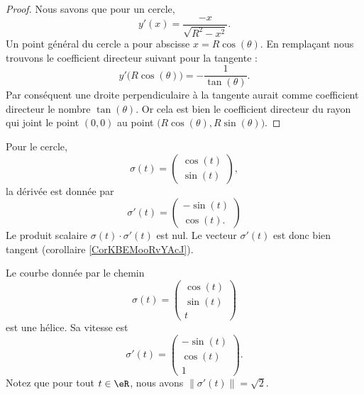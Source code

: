 \begin{proof}
    Nous savons que pour un cercle,
	\begin{equation}
		y'(x)=\frac{ -x }{ \sqrt{R^2-x^2} }.
	\end{equation}
	Un point général du cercle a pour abscisse $x=R\cos(\theta)$. En remplaçant nous trouvons le coefficient directeur suivant pour la tangente :
	\begin{equation}
		y'\big( R\cos(\theta) \big)=-\frac{1}{ \tan(\theta) }.
	\end{equation}
	Par conséquent une droite perpendiculaire à la tangente aurait comme coefficient directeur le nombre $\tan(\theta)$. Or cela est bien le coefficient directeur du rayon qui joint le point $(0,0)$ au point $\big( R\cos(\theta),R\sin(\theta) \big)$.

\end{proof}

\begin{example}
    Pour le cercle,
    \begin{equation}
        \sigma(t)=\begin{pmatrix}
            \cos(t)    \\ 
            \sin(t)    
        \end{pmatrix},
    \end{equation}
    la dérivée est donnée par
    \begin{equation}
        \sigma'(t)=\begin{pmatrix}
            -\sin(t)    \\ 
            \cos(t).    
        \end{pmatrix}
    \end{equation}
    Le produit scalaire $\sigma(t)\cdot \sigma'(t)$ est nul. Le vecteur $\sigma'(t)$ est donc bien tangent (corollaire \ref{CorKBEMooRvYAcJ}).
\end{example}

\begin{example}
    Le courbe donnée par le chemin
    \begin{equation}
        \sigma(t)=\begin{pmatrix}
            \cos(t)    \\ 
            \sin(t)    \\ 
            t    
        \end{pmatrix}
    \end{equation}
    est une hélice. Sa vitesse est
    \begin{equation}
        \sigma'(t)=\begin{pmatrix}
            -\sin(t)    \\ 
            \cos(t)    \\ 
            1    
        \end{pmatrix}.
    \end{equation}
    Notez que pour tout $t\in\eR$, nous avons $\| \sigma'(t) \|=\sqrt{2}$.
\end{example}

